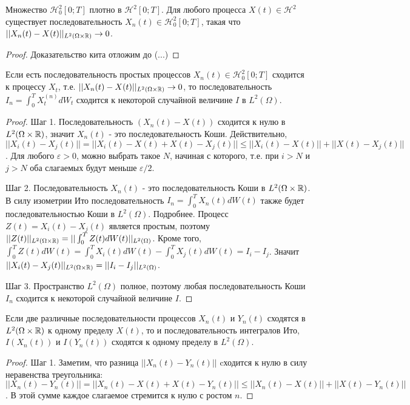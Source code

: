 {\begin{myth} Множество $\mathcal{H}_{0}^{2}[0;T]$ плотно в $\mathcal{H}^{2}[0;T]$. Для любого процесса $X(t)\in\mathcal{H}^{2}$ существует последовательность $X_{n}(t)\in\mathcal{H}_{0}^{2}[0;T]$, такая что $||X_{n}(t)-X(t)||_{L^{2}(\Omega \times \mathbb{R})}\to 0$.
\end{myth}
\begin{proof} Доказательство кита отложим до (...)
\end{proof}
\begin{myth} Если есть последовательность простых процессов $X_{n}(t)\in\mathcal{H}_{0}^{2}[0;T]$ сходится к процессу $X_{t}$, т.е. $||X_{n}(t)-X(t)||_{L^{2}(\Omega \times \mathbb{R})}\to 0$, то последовательность $I_{n}=\int_{0}^{T}X_{t}^{(n)}dW_{t}$ сходится к некоторой случайной величине $I$ в $L^{2}(\Omega)$.
\end{myth}
\begin{proof} Шаг 1. Последовательность $(X_{n}(t)-X(t))$ сходится к нулю в $L^{2}(\Omega \times \mathbb{R})$, значит $X_{n}(t)$ - это последовательность Коши. Действительно, $||X_{i}(t)-X_{j}(t)||=||X_{i}(t)-X(t)+X(t)-X_{j}(t)||\leq ||X_{i}(t)-X(t)||+||X(t)-X_{j}(t)||$. Для любого $\varepsilon>0$, можно выбрать такое $N$, начиная с которого, т.е. при $i>N$ и $j>N$ оба слагаемых будут меньше $\varepsilon/2$.

Шаг 2. Последовательность $X_{n}(t)$ - это последовательность Коши в $L^{2}(\Omega\times\mathbb{R})$. В силу изометрии Ито последовательность $I_{n}=\int_{0}^{T}X_{n}(t)dW(t)$ также будет последовательностью Коши в $L^{2}(\Omega)$. Подробнее. Процесс $Z(t)=X_{i}(t)-X_{j}(t)$ является простым, поэтому $||Z(t)||_{L^{2}(\Omega \times \mathbb{R})}=||\int_{0}^{T}Z(t)dW(t)||_{L^{2}(\Omega)}$. Кроме того, $\int_{0}^{T}Z(t)dW(t)=\int_{0}^{T}X_{i}(t)dW(t)-\int_{0}^{T}X_{j}(t)dW(t)=I_{i}-I_{j}$. Значит $||X_{i}(t)-X_{j}(t)||_{L^{2}(\Omega \times \mathbb{R})}=||I_{i}-I_{j}||_{L^{2}(\Omega)}$.

Шаг 3. Пространство $L^{2}(\Omega)$ полное, поэтому любая последовательность Коши $I_{n}$ сходится к некоторой случайной величине $I$.
\end{proof}

\begin{myth} Если две различные последовательности процессов $X_{n}(t)$ и $Y_{n}(t)$ сходятся в $L^{2}(\Omega\times \mathbb{R})$ к одному пределу $X(t)$, то и последовательность интегралов Ито, $I(X_{n}(t))$ и $I(Y_{n}(t))$ сходятся к одному пределу в $L^{2}(\Omega)$.
\end{myth}
\begin{proof} Шаг 1. Заметим, что разница $||X_{n}(t)-Y_{n}(t)||$ cходится к нулю в силу неравенства треугольника: $||X_{n}(t)-Y_{n}(t)||=||X_{n}(t)-X(t)+X(t)-Y_{n}(t)||\leq ||X_{n}(t)-X(t)||+||X(t)-Y_{n}(t)||$. В этой сумме каждое слагаемое стремится к нулю с ростом $n$.


\end{proof}}
